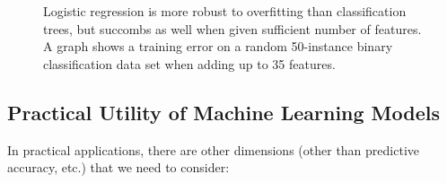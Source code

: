 \begin{refsection}
\begin{figure}[htbp]
\label{fig:lr-overfitting}
\caption{Logistic regression is more robust to overfitting than classification trees, but succombs as well when given sufficient number of features. A graph shows a training error on a random 50-instance binary classification data set when adding up to 35 features.}
\end{figure}

\subsection*{Practical Utility of Machine Learning Models}

In practical applications, there are other dimensions (other than predictive accuracy, etc.) that we need to consider:


\end{refsection}
